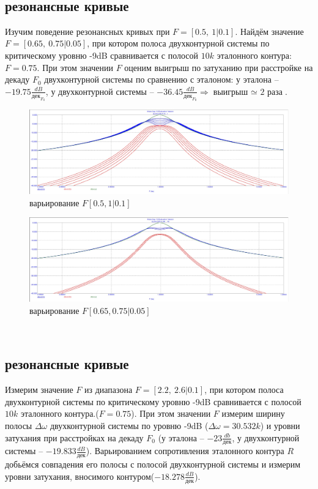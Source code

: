 \documentclass[a4paper, 14pt]{extarticle}%
\begin{document}
~

\subsection{резонансные кривые}

Изучим поведение резонансных кривых при $F = [0.5,~1|0.1]$. Найдём значение $F = [0.65,~0.75|0.05]$, при котором полоса двухконтурной системы по критическому уровню -9dB сравнивается с полосой $10k$ эталонного контура: $F = 0.75$. При этом значении $F$ оценим выигрыш по затуханию при расстройке на декаду $F_0$ двухконтурной системы по сравнению с эталоном: у эталона -- $-19.75\frac{dB}{\text{дек}_{F_0}}$, у двухконтурной системы -- $-36.45\frac{dB}{\text{дек}_{F_0}} \Longrightarrow \text{выигрыш $\simeq$ 2 раза}$.

\begin{figure}[h!]
	\centering
			\includegraphics[width=1.1\linewidth]{1.6varF1.jpg}
            \caption{варьирование $F [0.5, 1|0.1]$}
	\label{A}
\end{figure}

\begin{figure}[h!]
	\centering
			\includegraphics[width=1.1\linewidth]{1.6varF2.jpg}
            \caption{варьирование $F [0.65, 0.75|0.05]$}
	\label{A}
\end{figure}

~

\subsection{резонансные кривые}

Измерим значение $F$ из диапазона $F = [2.2,~2.6|0.1]$, при котором полоса двухконтурной системы по критическому уровню -9dB сравнивается с полосой $10k$ эталонного контура.($F = 0.75$). При этом значении $F$ измерим ширину полосы $\Delta \omega$ двухконтурной системы по уровню -9dB ($\Delta \omega = 30.532k$) и уровни затухания при расстройках на декаду $F_0$ (у эталона -- $-23\frac{db}{\text{дек}}$, у двухконтурной системы -- $-19.833\frac{dB}{\text{дек}}$). Варьированием сопротивления эталонного контура $R$ добьёмся совпадения его полосы с полосой двухконтурной системы и измерим уровни затухания, вносимого контуром($-18.278\frac{dB}{\text{дек}}$).
\end{document}
